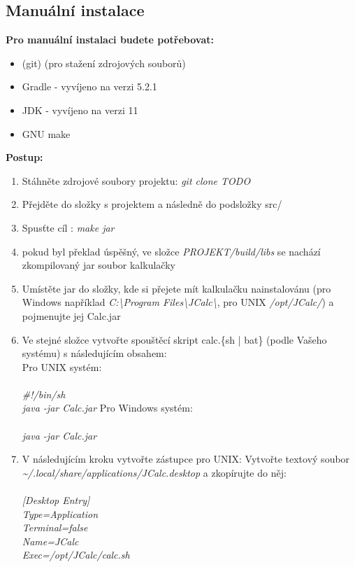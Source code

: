 \documentclass[a4paper, 11pt]{article}
\begin{document}
\subsection{Manuální instalace}

\textbf{Pro manuální instalaci budete potřebovat:}

\begin{itemize}
	\item (git) (pro stažení zdrojových souborů)
	\item Gradle - vyvíjeno na verzi 5.2.1
	\item JDK - vyvíjeno na verzi 11
	\item GNU make
\end{itemize}

\noindent
\textbf{Postup:}

\begin{enumerate}
	\item Stáhněte zdrojové soubory projektu: \emph{git clone TODO}
	\item Přejděte do složky s projektem a následně do podsložky src/
	\item Spusťte cíl : \emph{make jar}
	\item pokud byl překlad úspěšný, ve složce \emph{PROJEKT/build/libs} se nachází zkompilovaný jar soubor kalkulačky
	\item Umístěte jar do složky, kde si přejete mít kalkulačku nainstalovánu (pro Windows například \emph{C:\textbackslash Program Files\textbackslash JCalc\textbackslash}, pro UNIX \emph{/opt/JCalc/}) a pojmenujte jej Calc.jar
	\item Ve stejné složce vytvořte spouštěcí skript calc.\{sh | bat\} (podle Vašeho systému) s následujícím obsahem:\\
		\subitem Pro UNIX systém:\\\\
			\emph{\#!/bin/sh\\
				java -jar Calc.jar}
		\subitem Pro Windows systém:\\\\
			\emph{java -jar Calc.jar}

	\item V následujícím kroku vytvořte zástupce
		\subitem pro UNIX:
			\subsubitem Vytvořte textový soubor \emph{\textasciitilde/.local/share/applications/JCalc.desktop} a zkopírujte do něj:\\\\
						\emph{
						[Desktop Entry]\\
						Type=Application\\
						Terminal=false\\
						Name=JCalc\\
						Exec=/opt/JCalc/calc.sh\\
						}


\end{enumerate}
\end{document}
